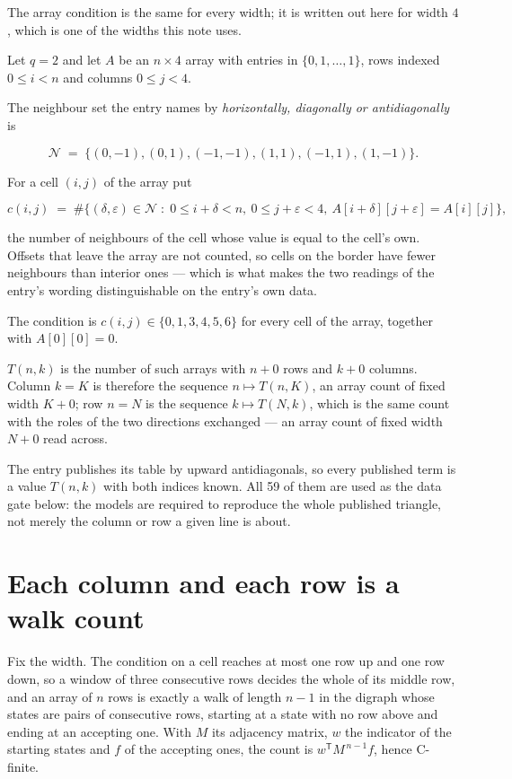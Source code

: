 \documentclass[11pt]{article}
\theoremstyle{definition}
\begin{document}
The array condition is the same for every width; it is written out here for width $4$, which is one of the widths this note uses.

Let $q = 2$ and let $A$ be an $n \times 4$ array with entries in $\{0,1,\dots,1\}$, rows indexed $0 \le i < n$ and columns $0 \le j < 4$.

The neighbour set the entry names by {\itshape horizontally, diagonally or antidiagonally} is

\[\mathcal{N} \;=\; \{(0,-1), (0,1), (-1,-1), (1,1), (-1,1), (1,-1)\}.\]

For a cell $(i,j)$ of the array put

\[c(i,j) \;=\; \#\bigl\{(\delta,\varepsilon)\in\mathcal{N} \;:\; 0\le i+\delta<n,\ 0\le j+\varepsilon<4,\ A[i+\delta][j+\varepsilon] = A[i][j]\bigr\},\]

the number of neighbours of the cell whose value is equal to the cell's own. Offsets that leave the array are not counted, so cells on the border have fewer neighbours than interior ones --- which is what makes the two readings of the entry's wording distinguishable on the entry's own data.

The condition is $c(i,j) \in \{0, 1, 3, 4, 5, 6\}$ for every cell of the array, together with $A[0][0]=0$.

$T(n,k)$ is the number of such arrays with $n + 0$ rows and $k + 0$ columns. Column $k = K$ is therefore the sequence $n \mapsto T(n,K)$, an array count of fixed width $K + 0$; row $n = N$ is the sequence $k \mapsto T(N,k)$, which is the same count with the roles of the two directions exchanged --- an array count of fixed width $N + 0$ read across.

The entry publishes its table by upward antidiagonals, so every published term is a value $T(n,k)$ with both indices known. All 59 of them are used as the data gate below: the models are required to reproduce the whole published triangle, not merely the column or row a given line is about.

\section{Each column and each row is a walk count}

Fix the width. The condition on a cell reaches at most one row up and one row down, so a window of three consecutive rows decides the whole of its middle row, and an array of $n$ rows is exactly a walk of length $n-1$ in the digraph whose states are pairs of consecutive rows, starting at a state with no row above and ending at an accepting one. With $M$ its adjacency matrix, $w$ the indicator of the starting states and $f$ of the accepting ones, the count is $w^{\mathsf T}M^{\,n-1}f$, hence C-finite.
\end{document}
